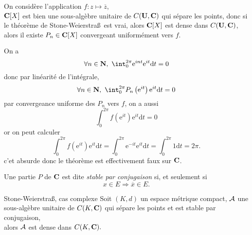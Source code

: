 \documentclass[a4paper,11pt, twoside]{article}
\begin{document}


\begin{Proof}
  On considère l'application $f:z\longmapsto \overline z$,\\
  $\mathbf C[X]$ est bien une sous-algèbre unitaire de $C(\mathbf U,\mathbf C)$ qui sépare les points, donc si le théorème de Stone-Weierstra\ss\ est vrai, alors $\mathbf C[X]$ est dense dans $C(\mathbf U,\mathbf C)$, alors il existe $P_n\in\mathbf C[X]$ convergeant uniformément vers $f$.

  On a 
  $$\forall n\in\N,\ \int_0^{2\pi}\mathrm e^{int}\mathrm e^{it}\mathrm dt=0$$
  donc par linéarité de l'intégrale,
  $$\forall n\in\N,\ \int_0^{2\pi}P_n\left(\mathrm e^{it}\right)\mathrm e^{it}\mathrm dt=0$$
  par convergeance uniforme des $P_n$ vers $f$, on a aussi
  $$\int_0^{2\pi}f\left(\mathrm e^{it}\right)\mathrm e^{it}\mathrm dt=0$$
  or on peut calculer
  $$\int_0^{2\pi}f\left(\mathrm e^{it}\right)\mathrm e^{it}\mathrm dt=\int_0^{2\pi}\mathrm e^{-it}\mathrm e^{it}\mathrm dt=\int_0^{2\pi}1\mathrm dt=2\pi.$$
  c'et absurde donc le théorème est effectivement faux sur $\mathbf C$.
\end{Proof}

\begin{Def}
  Une partie $P$ de $\mathbf C$ est dite \emph{stable par conjugaison} si, et seulement si
  $$ x\in E\Rightarrow \overline x\in E.$$
\end{Def}

\begin{thC}{Stone-Weierstra\ss, cas complexe}
  Soit $(K,d)$ un espace métrique compact, $\mathcal A$ une sous-algèbre unitaire de $C(K,\mathbf C)$ qui sépare les points et est stable par conjugaison,\\

  alors $\mathcal A$ est dense dans $C(K,\mathbf C).$
\end{thC}
\end{document}
